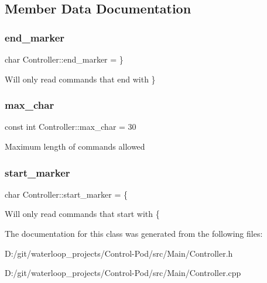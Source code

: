 \subsection{Member Data Documentation}
\mbox{\label{class_controller_a4df4acb1afd60491caaa6eb1d056ded7}} 
\subsubsection{\texorpdfstring{end\+\_\+marker}{end\_marker}}
{\footnotesize\ttfamily char Controller\+::end\+\_\+marker = \textquotesingle{}\}\textquotesingle{}\hspace{0.3cm}{\ttfamily [private]}}

Will only read commands that end with \} \mbox{\label{class_controller_a5dc336008413ea41127c35433ddb0a5c}} 
\subsubsection{\texorpdfstring{max\+\_\+char}{max\_char}}
{\footnotesize\ttfamily const int Controller\+::max\+\_\+char = 30\hspace{0.3cm}{\ttfamily [private]}}

Maximum length of commands allowed \mbox{\label{class_controller_a2c3ddfae9a818827a9fcb17ea6338a43}} 
\subsubsection{\texorpdfstring{start\+\_\+marker}{start\_marker}}
{\footnotesize\ttfamily char Controller\+::start\+\_\+marker = \textquotesingle{}\{\textquotesingle{}\hspace{0.3cm}{\ttfamily [private]}}

Will only read commands that start with \{ 

The documentation for this class was generated from the following files\+:\begin{DoxyCompactItemize}
\item 
D\+:/git/waterloop\+\_\+projects/\+Control-\/\+Pod/src/\+Main/Controller.\+h\item 
D\+:/git/waterloop\+\_\+projects/\+Control-\/\+Pod/src/\+Main/Controller.\+cpp\end{DoxyCompactItemize}
